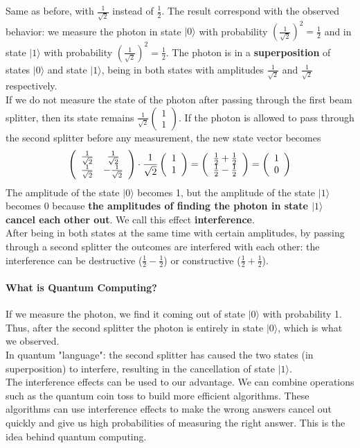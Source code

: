 \documentclass[10pt]{report}
\begin{document}
Same as before, with $\frac{1}{\sqrt{2}}$ instead of $\frac{1}{2}$. The result correspond with the observed behavior: we measure the photon in state $|0\rangle$ with probability $\left(\frac{1}{\sqrt{2}}\right)^2=\frac{1}{2}$ and in state $|1\rangle$ with probability $\left(\frac{1}{\sqrt{2}}\right)^2=\frac{1}{2}$. The photon is in a \textbf{superposition} of states $|0\rangle$ and state $|1\rangle$, being in both states with amplitudes $\frac{1}{\sqrt{2}}$ and $\frac{1}{\sqrt{2}}$ respectively.\\
If we do not measure the state of the photon after passing through the first beam splitter, then its state remains $\frac{1}{\sqrt{2}}\left(\begin{array}{c}
1\\1
\end{array}\right)$. If the photon is allowed to pass through the second splitter before any measurement, the new state vector becomes
$$\left(\begin{array}{c c}
\frac{1}{\sqrt{2}}&\frac{1}{\sqrt{2}}\\\frac{1}{\sqrt{2}}&-\frac{1}{\sqrt{2}}
\end{array}\right)\cdot\frac{1}{\sqrt{2}}\left(\begin{array}{c}
1\\1
\end{array}\right) = \left(\begin{array}{c}
\frac{1}{2} + \frac{1}{2}\\\frac{1}{2}-\frac{1}{2}
\end{array}\right) = \left(\begin{array}{c}
1\\0
\end{array}\right)$$
The amplitude of the state $|0\rangle$ becomes 1, but the amplitude of the state $|1\rangle$ becomes 0 because \textbf{the amplitudes of finding the photon in state $|1\rangle$ cancel each other out}. We call this effect \textbf{interference}.\\
After being in both states at the same time with certain amplitudes, by passing through a second splitter the outcomes are interfered with each other: the interference can be destructive ($\frac{1}{2} - \frac{1}{2}$) or constructive ($\frac{1}{2} + \frac{1}{2}$).
\paragraph{What is Quantum Computing?} If we measure the photon, we find it coming out of state $|0\rangle$ with probability 1. Thus, after the second splitter the photon is entirely in state $|0\rangle$, which is what we observed.\\
In quantum "language": the second splitter has caused the two states (in superposition) to interfere, resulting in the cancellation of state $|1\rangle$.\\
The interference effects can be used to our advantage. We can combine operations such as the quantum coin toss to build more efficient algorithms. These algorithms can use interference effects to make the wrong answers cancel out quickly and give us high probabilities of measuring the right answer. This is the idea behind quantum computing.
\end{document}
